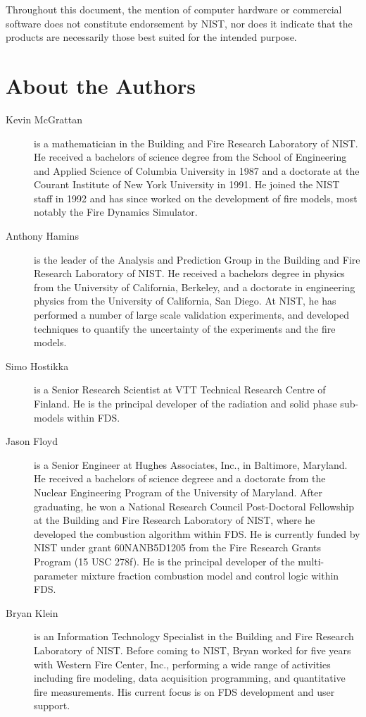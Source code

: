 \documentclass[11pt]{book}
\begin{document}
Throughout this document, the mention of computer hardware or commercial
software does not constitute endorsement by NIST, nor does it indicate that
the products are necessarily those best suited for the intended purpose.




\chapter{About the Authors}

\begin{description}
\item[Kevin McGrattan] is a mathematician in the Building and Fire
Research Laboratory of NIST. He received a bachelors of science degree
from the School of Engineering and Applied Science of Columbia
University in 1987 and a doctorate at the Courant Institute of New
York University in 1991. He joined the NIST staff in 1992 and has
since worked on the development of fire models, most notably the Fire
Dynamics Simulator.
\item[Anthony Hamins] is the leader of the Analysis and Prediction Group in the Building and Fire Research Laboratory of NIST.
He received a bachelors degree in physics from the University of California, Berkeley, and a doctorate
in engineering physics from the University of California, San Diego. At NIST, he has performed a number of large
scale validation experiments, and developed techniques to quantify the uncertainty of the experiments and the fire
models.
\item[Simo Hostikka] is a Senior Research Scientist at VTT Technical
Research Centre of Finland.  He is the principal developer of the
radiation and solid phase sub-models within FDS.
\item[Jason Floyd] is a Senior Engineer at Hughes Associates, Inc., in
Baltimore, Maryland. He received a bachelors of science degreee and a
doctorate from the Nuclear Engineering Program of the University of
Maryland. After graduating, he won a National Research Council
Post-Doctoral Fellowship at the Building and Fire Research Laboratory
of NIST, where he developed the combustion algorithm within FDS. He is
currently funded by NIST under grant 60NANB5D1205 from the Fire
Research Grants Program (15 USC 278f).  He is the principal developer
of the multi-parameter mixture fraction combustion model and control
logic within FDS.
\item[Bryan Klein] is an Information Technology Specialist in the
Building and Fire Research Laboratory of NIST.  Before coming to NIST,
Bryan worked for five years with Western Fire Center, Inc., performing a
wide range of activities including fire modeling, data acquisition programming,
and quantitative fire measurements. His current focus is on FDS development and
user support.
\end{description}
\end{document}
